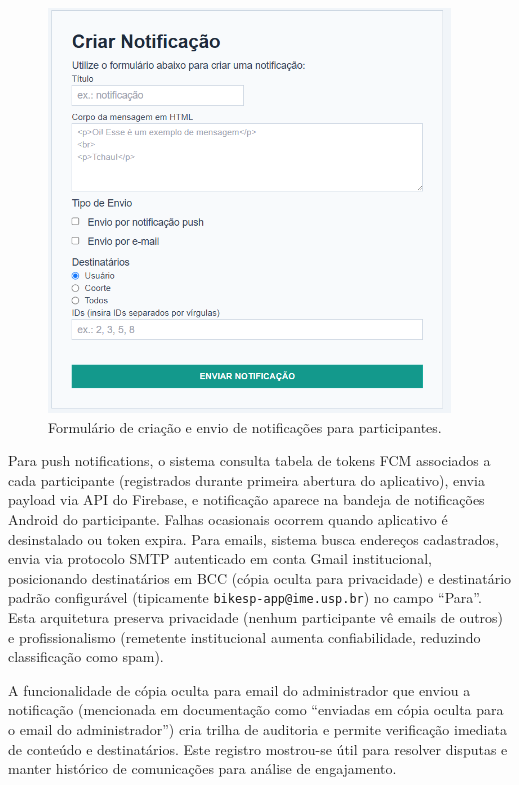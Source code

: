  \begin{figure}[H]
   \centering
   \includegraphics[width=0.95\textwidth]{figuras/notificacao_criar.PNG}
   \caption{Formulário de criação e envio de notificações para participantes.}
   \label{fig:notificacao_criar}
 \end{figure}

Para push notifications, o sistema consulta tabela de tokens FCM associados a cada participante (registrados durante primeira abertura do aplicativo), envia payload via API do Firebase, e notificação aparece na bandeja de notificações Android do participante. Falhas ocasionais ocorrem quando aplicativo é desinstalado ou token expira. Para emails, sistema busca endereços cadastrados, envia via protocolo SMTP autenticado em conta Gmail institucional, posicionando destinatários em BCC (cópia oculta para privacidade) e destinatário padrão configurável (tipicamente \texttt{bikesp-app@ime.usp.br}) no campo ``Para''. Esta arquitetura preserva privacidade (nenhum participante vê emails de outros) e profissionalismo (remetente institucional aumenta confiabilidade, reduzindo classificação como spam).

A funcionalidade de cópia oculta para email do administrador que enviou a notificação (mencionada em documentação como ``enviadas em cópia oculta para o email do administrador'') cria trilha de auditoria e permite verificação imediata de conteúdo e destinatários. Este registro mostrou-se útil para resolver disputas e manter histórico de comunicações para análise de engajamento.

